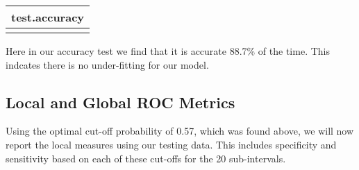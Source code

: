 \documentclass[
]{article}
\begin{document}
\begin{longtable}[]{@{}c@{}}
\toprule\noalign{}
test.accuracy \\
\midrule\noalign{}
\endhead
\bottomrule\noalign{}
\endlastfoot
0.8904372 \\
\end{longtable}

Here in our accuracy test we find that it is accurate 88.7\% of the
time. This indcates there is no under-fitting for our model.

\subsection{Local and Global ROC
Metrics}\label{local-and-global-roc-metrics}

Using the optimal cut-off probability of 0.57, which was found above, we
will now report the local measures using our testing data. This includes
specificity and sensitivity based on each of these cut-offs for the 20
sub-intervals.
\end{document}
